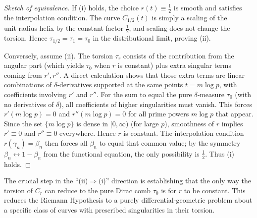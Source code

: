 \documentclass[12pt,a4paper]{article}
\begin{document}
\begin{proof}[Sketch of equivalence]
If (i) holds, the choice $r(t)\equiv\frac12$ is smooth and satisfies the interpolation condition.  The curve $C_{1/2}(t)$ is simply a scaling of the unit‑radius helix by the constant factor $\frac12$, and scaling does not change the torsion.  Hence $\tau_{1/2} = \tau_1 = \tau_0$ in the distributional limit, proving (ii).

Conversely, assume (ii).  The torsion $\tau_r$ consists of the contribution from the angular part (which yields $\tau_0$ when $r$ is constant) plus extra singular terms coming from $r',r''$.  A direct calculation shows that those extra terms are linear combinations of $\delta$‑derivatives supported at the same points $t=m\log p$, with coefficients involving $r'$ and $r''$.  For the sum to equal the pure $\delta$‑measure $\tau_0$ (with no derivatives of $\delta$), all coefficients of higher singularities must vanish.  This forces $r'(m\log p)=0$ and $r''(m\log p)=0$ for all prime powers $m\log p$ that appear.  Since the set $\{m\log p\}$ is dense in $[0,\infty)$ (for large $p$), smoothness of $r$ implies $r'\equiv0$ and $r''\equiv0$ everywhere.  Hence $r$ is constant.  The interpolation condition $r(\gamma_n)=\beta_n$ then forces all $\beta_n$ to equal that common value; by the symmetry $\beta_n\leftrightarrow1-\beta_n$ from the functional equation, the only possibility is $\frac12$.  Thus (i) holds.
\end{proof}

The crucial step in the “(ii)$\Rightarrow$(i)” direction is establishing that the only way the torsion of $C_r$ can reduce to the pure Dirac comb $\tau_0$ is for $r$ to be constant.  This reduces the Riemann Hypothesis to a purely differential‑geometric problem about a specific class of curves with prescribed singularities in their torsion.
\end{document}
